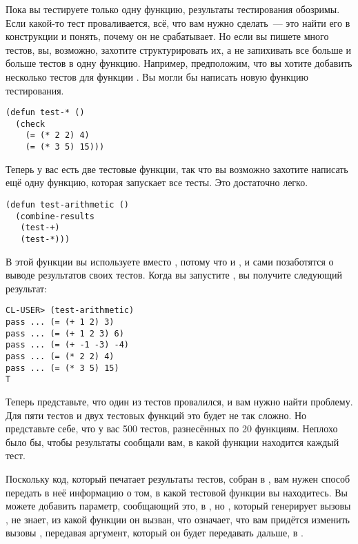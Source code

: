 Пока вы тестируете только одну функцию, результаты тестирования обозримы. Если какой-то
тест проваливается, всё, что вам нужно сделать~--- это найти его в конструкции 
и понять, почему он не срабатывает. Но если вы пишете много тестов, вы, возможно, захотите
структурировать их, а не запихивать все больше и больше тестов в одну функцию. Например,
предположим, что вы хотите добавить несколько тестов для функции \code{*}. Вы могли бы
написать новую функцию тестирования.

\begin{lstlisting}
(defun test-* ()
  (check
    (= (* 2 2) 4)
    (= (* 3 5) 15)))
\end{lstlisting}

Теперь у вас есть две тестовые функции, так что вы возможно захотите написать ещё одну
функцию, которая запускает все тесты. Это достаточно легко.

\begin{lstlisting}
(defun test-arithmetic ()
  (combine-results
   (test-+)
   (test-*)))
\end{lstlisting}

В этой функции вы используете  вместо , потому что и
, и  сами позаботятся о выводе результатов своих тестов. Когда
вы запустите , вы получите следующий результат:

\begin{lstlisting}
CL-USER> (test-arithmetic)
pass ... (= (+ 1 2) 3)
pass ... (= (+ 1 2 3) 6)
pass ... (= (+ -1 -3) -4)
pass ... (= (* 2 2) 4)
pass ... (= (* 3 5) 15)
T
\end{lstlisting}

Теперь представьте, что один из тестов провалился, и вам нужно найти проблему. Для пяти
тестов и двух тестовых функций это будет не так сложно. Но представьте себе, что у вас 500
тестов, разнесённых по 20 функциям. Неплохо было бы, чтобы результаты сообщали вам, в
какой функции находится каждый тест.

Поскольку код, который печатает результаты тестов, собран в , вам
нужен способ передать в неё информацию о том, в какой тестовой функции вы находитесь. Вы
можете добавить параметр, сообщающий это, в , но , который
генерирует вызовы , не знает, из какой функции он вызван, что
означает, что вам придётся изменить вызовы , передавая аргумент, который он
будет передавать дальше, в .

